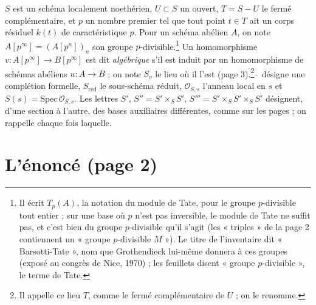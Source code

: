 \documentclass[11pt,a4paper]{article}
\begin{document}
$S$ est un schéma localement noethérien, $U \subset S$ un ouvert, $T = S - U$ le
fermé complémentaire, et $p$ un nombre premier tel que tout point $t \in T$ ait
un corps résiduel $k(t)$ de caractéristique $p$. Pour un schéma abélien $A$, on
note $A[p^\infty] = (A[p^n])_n$ son groupe $p$-divisible.\footnote{Il écrit
$T_p(A)$, la notation du module de Tate, pour le groupe $p$-divisible tout
entier ; sur une base où $p$ n'est pas inversible, le module de Tate ne suffit
pas, et c'est bien du groupe $p$-divisible qu'il s'agit (les « triples » de la
page 2 contiennent un « groupe $p$-divisible $M$ »). Le titre de l'inventaire
dit « Barsotti-Tate », nom que Grothendieck lui-même donnera à ces groupes
(exposé au congrès de Nice, 1970) ; les feuillets disent « groupe
$p$-divisible », le terme de Tate.} Un homomorphisme
$v : A[p^\infty] \to B[p^\infty]$ est dit \emph{algébrique} s'il est induit par
un homomorphisme de schémas abéliens $u : A \to B$ ; on note $S_v$ le lieu
où il l'est (page 3).\footnote{Il appelle ce lieu $T$, comme le fermé
complémentaire de $U$ ; on le renomme.} $\hat{\ }$ désigne une complétion
formelle, $S_{\mathrm{red}}$ le sous-schéma réduit, $\mathcal{O}_{S,s}$ l'anneau
local en $s$ et $S(s) = \mathrm{Spec}\,\mathcal{O}_{S,s}$. Les lettres $S'$,
$S''= S' \times_S S'$, $S''' = S' \times_S S' \times_S S'$ désignent, d'une
section à l'autre, des bases auxiliaires différentes, comme sur les pages ; on
rappelle chaque fois laquelle.

\section*{L'énoncé (page 2)}
\end{document}
